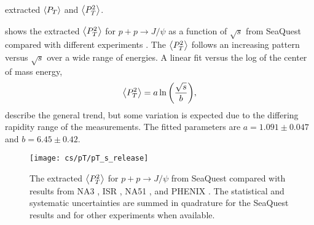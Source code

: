 \documentclass[../main.tex]{subfiles}
\begin{document}
\begin{table}[h!]
	\centering
	\caption{extracted $\expval{P_T}$ and $\expval{P^2_T}$.}
	\label{tab:kaplan_result}
	
\end{table}

 shows the extracted $\expval{P_T^2}$ for $p+p\to J/\psi$ as a function
of $\sqrt{s}$ from SeaQuest compared with different experiments
\cite{badier1983,clark1978,drapier1998,acharya2020}. The $\expval{P_T^2}$ follows an
increasing pattern versus $\sqrt{s}$ over a wide range of energies.
A linear fit versus the log of the center of mass energy\cite{acharya2020},
\begin{equation}
	\expval{P_T^2}=a\ln{\left( \frac{\sqrt{s}}{b} \right)},
\end{equation}
describe the general trend, but some variation is expected due to the differing
rapidity range of the measurements.
The fitted parameters are $a=1.091\pm0.047$ and $b=6.45\pm0.42$.
\begin{figure}
	\centering
	\texttt{[image: cs/pT/pT\_s\_release]}
	\caption{The extracted $\expval{P_T^2}$ for $p+p\rightarrow J/\psi$ from SeaQuest compared
		with results from NA3 \cite{badier1983}, ISR \cite{clark1978}, NA51 \cite{drapier1998},
		and PHENIX \cite{acharya2020}. The statistical and systematic uncertainties are summed in quadrature for
		the SeaQuest results and for other experiments when available.   }
	\label{fig:pT_s}
\end{figure}

\FloatBarrier

\ifSubfilesClassLoaded{ \printbibliography[heading=bibintoc,title={References}]}{}
\end{document}
